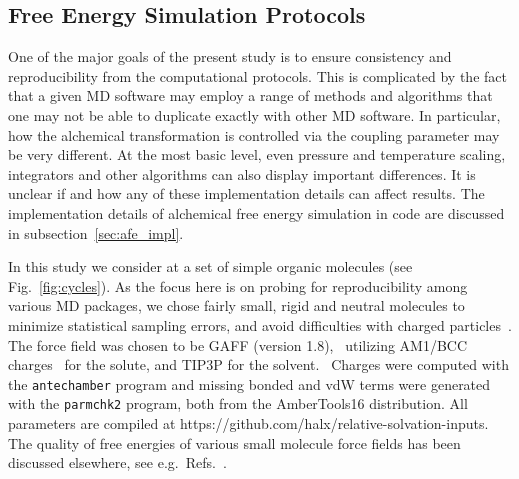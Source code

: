 \documentclass[journal=jctcce,manuscript=article]{achemso}
\newcommand{\progname}[1]{\texttt{#1}}
\begin{document}
\subsection{Free Energy Simulation Protocols}
\label{sec:rafe_protocols}

One of the major goals of the present study is to ensure
consistency and reproducibility from the computational protocols.  This is complicated by the fact
that a given MD software may employ a range of methods and algorithms that one may not be
able to duplicate exactly with other MD software.
In particular, how the alchemical transformation is controlled via the coupling parameter may be very different.
At the most basic level, even pressure and temperature scaling, integrators and other algorithms can also display important differences.
It is unclear if and how any of these implementation details can affect results.
The implementation details of alchemical free energy simulation in code are discussed in subsection~\ref{sec:afe_impl}.

In this study we consider at a set of simple organic molecules (see
Fig.~\ref{fig:cycles}).  As the focus here is on probing for
reproducibility among various MD packages, we chose fairly small,
rigid and neutral molecules to minimize statistical sampling errors, and
avoid difficulties with charged
particles~\cite{rocklin_calculating_2013, JCC:JCC1050}.  The force
field was chosen to be GAFF (version
1.8),~\cite{wang_development_2004} utilizing AM1/BCC charges~ for the solute,\cite{jakalian_fast_2000,jakalian_fast_2002} and
TIP3P for the solvent.~\cite{jorgensen_comparison_1983-1}
%
%
%
%
Charges were computed with the \progname{antechamber} program and
missing bonded and vdW terms were generated with the
\progname{parmchk2} program, both from the AmberTools16 distribution.
All parameters are compiled at
https://github.com/halx/relative-solvation-inputs.
The quality of free energies of various small molecule force fields
has been discussed elsewhere, see
e.g.\ Refs.~.
\end{document}
